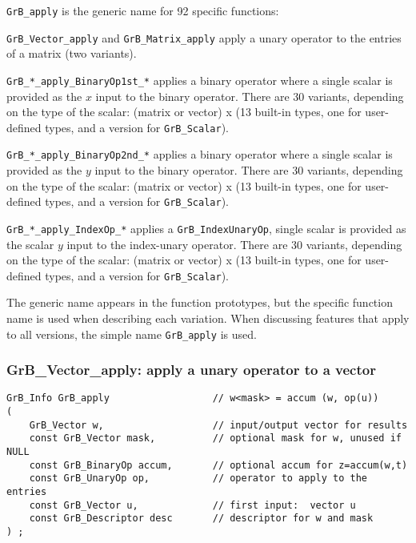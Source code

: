 \documentclass[12pt]{article}
\newenvironment{packed_itemize}{
\begin{itemize}
  \setlength{\itemsep}{1pt}
  \setlength{\parskip}{0pt}
  \setlength{\parsep}{0pt}
}{\end{itemize}}
\begin{document}
{\verb'GrB_apply' is the generic name for 92 specific functions:

\begin{packed_itemize}
\item
\verb'GrB_Vector_apply' and \verb'GrB_Matrix_apply' apply a unary operator to
the entries of a matrix (two variants).

\item \verb'GrB_*_apply_BinaryOp1st_*' applies a binary
operator where a single scalar is provided as the $x$ input to the binary
operator.
There are 30 variants, depending on the type of the scalar: (matrix or vector)
x (13 built-in types, one for user-defined types, and a version for
\verb'GrB_Scalar').

\item \verb'GrB_*_apply_BinaryOp2nd_*' applies a binary operator where a
single scalar is provided as the $y$ input to the binary operator.
There are 30 variants, depending on the type of the scalar: (matrix or vector)
x (13 built-in types, one for user-defined types, and a version for
\verb'GrB_Scalar').

\item \verb'GrB_*_apply_IndexOp_*' applies a \verb'GrB_IndexUnaryOp',
single scalar is provided as the scalar $y$ input to the index-unary operator.
There are 30 variants, depending on the type of the scalar: (matrix or vector)
x (13 built-in types, one for user-defined types, and a version for
\verb'GrB_Scalar').

\end{packed_itemize}

The generic
name appears in the function prototypes, but the specific function name is used
when describing each variation.  When discussing features that apply to all
versions, the simple name \verb'GrB_apply' is used.

\newpage
\subsubsection{{\sf GrB\_Vector\_apply:} apply a unary operator to a vector}
\label{apply_vector}

\begin{mdframed}[userdefinedwidth=6in]
{\footnotesize
\begin{verbatim}
GrB_Info GrB_apply                  // w<mask> = accum (w, op(u))
(
    GrB_Vector w,                   // input/output vector for results
    const GrB_Vector mask,          // optional mask for w, unused if NULL
    const GrB_BinaryOp accum,       // optional accum for z=accum(w,t)
    const GrB_UnaryOp op,           // operator to apply to the entries
    const GrB_Vector u,             // first input:  vector u
    const GrB_Descriptor desc       // descriptor for w and mask
) ;
\end{verbatim} } \end{mdframed}

}
\end{document}

